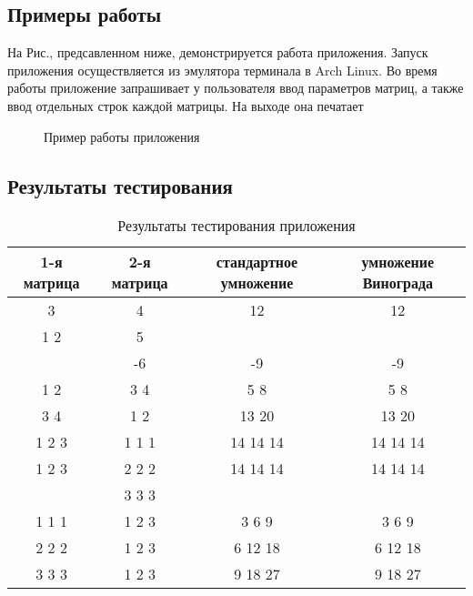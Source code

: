 \documentclass[a4paper,12pt]{article}
\begin{document}
\newpage
\subsection{Примеры работы}
\begin{flushleft}
На Рис., предсавленном ниже, демонстрируется работа приложения. Запуск приложения осуществляется из эмулятора терминала в Arch Linux. Во время работы приложение запрашивает у пользователя ввод параметров матриц, а также ввод отдельных строк каждой матрицы. На выходе она печатает
\end{flushleft}
\begin{figure}[h]
\caption{Пример работы приложения}
\label{images:example}
\end{figure}

\newpage
\subsection{Результаты тестирования}

\begin{table}[h]
\caption{\label{tablice:tests}Результаты тестирования приложения}
\begin{center}
\begin{tabular}{|c|c|c|c|}
\hline
1-я матрица & 2-я матрица & стандартное умножение & умножение Винограда \\
\hline
3 & 4 & 12 & 12 \\
\hline
1 2 & 5 & & \\
 & -6 & -9 & -9 \\
\hline
1 2 & 3 4 & 5 8 & 5 8 \\
3 4 & 1 2 & 13 20 & 13 20 \\
\hline
1 2 3 & 1 1 1 & 14 14 14 & 14 14 14 \\
1 2 3 & 2 2 2 & 14 14 14 & 14 14 14 \\
      & 3 3 3 & & \\
\hline
1 1 1 & 1 2 3 & 3 6 9 & 3 6 9 \\
2 2 2 & 1 2 3 & 6 12 18 & 6 12 18 \\
3 3 3 & 1 2 3 & 9 18 27 & 9 18 27 \\
\hline
\end{tabular}
\end{center}
\end{table}


\newpage
\end{document}
